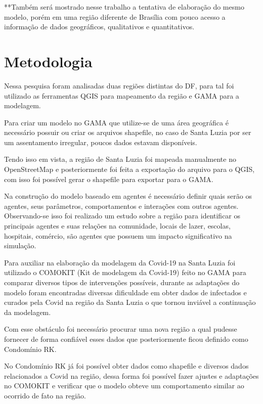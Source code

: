 **Também será mostrado nesse trabalho a tentativa de elaboração do mesmo modelo, porém em uma região diferente de Brasília com pouco acesso a informação de dados geográficos, qualitativos e quantitativos.


\section{Metodologia}%

Nessa pesquisa foram analisadas duas regiões distintas do DF, para tal foi utilizado as ferramentas QGIS para mapeamento da região e GAMA para a modelagem. 

Para criar um modelo no GAMA que utilize-se de uma área geográfica é necessário possuir ou criar os arquivos shapefile, no caso de Santa Luzia por ser um assentamento irregular, poucos dados estavam disponíveis.

Tendo isso em vista, a região de Santa Luzia foi mapeada manualmente no OpenStreetMap e posteriormente foi feita a exportação do arquivo para o QGIS, com isso foi possível gerar o shapefile para exportar para o GAMA. 

Na construção do modelo baseado em agentes é necessário definir quais serão os agentes, seus parâmetros, comportamentos e interações com outros agentes. Observando-se isso foi realizado um estudo sobre a região para identificar os principais agentes e suas relações na comunidade, locais de lazer, escolas, hospitais, comércio, são agentes que possuem um impacto significativo na simulação.

Para auxiliar na elaboração da modelagem da Covid-19 na Santa Luzia foi utilizado o COMOKIT (Kit de modelagem da Covid-19) feito no GAMA para comparar diversos tipos de intervenções possíveis, durante as adaptações do modelo foram encontradas diversas dificuldade em obter dados de infectados e curados pela Covid na região da Santa Luzia o que tornou inviável a continuação da modelagem.

Com esse obstáculo foi necessário procurar uma nova região a qual pudesse fornecer de forma confiável esses dados que posteriormente ficou definido como Condomínio RK.

No Condomínio RK já foi possível obter dados como shapefile e diversos dados relacionados a Covid na região, dessa forma foi possível fazer ajustes e adaptações no COMOKIT e verificar que o modelo obteve um comportamento similar ao ocorrido de fato na região.

